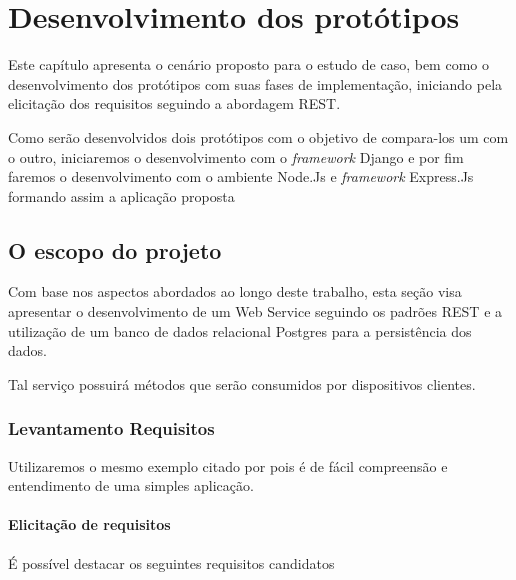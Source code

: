 
\chapter{Desenvolvimento dos protótipos}
\label{desenvolvimento-prototipos}

\vspace{-1.9cm}


  Este capítulo apresenta o cenário proposto para o estudo de caso, bem
  como o desenvolvimento dos protótipos com suas fases de implementação, iniciando
  pela elicitação dos requisitos seguindo a abordagem \ac{REST}.
  
  Como serão desenvolvidos dois protótipos com o objetivo de compara-los um com o outro,
  iniciaremos o desenvolvimento com o \textit{framework} Django e por fim faremos o desenvolvimento
  com o ambiente Node.Js e \textit{framework} Express.Js formando assim a aplicação proposta
  
\section{O escopo do projeto}
\label{escopo-projeto}

  Com base nos aspectos abordados ao longo deste trabalho, 
  esta seção visa apresentar o desenvolvimento de um Web Service seguindo os padrões \ac{REST} e a utilização 
  de um banco de dados relacional Postgres para a persistência dos dados.
  
  Tal serviço possuirá métodos que serão consumidos por dispositivos clientes.

\subsection{Levantamento Requisitos}
\label{levantamento-requisitos}

  Utilizaremos o mesmo exemplo citado por \cite{Pereira:2013} pois é de fácil compreensão
  e entendimento de uma simples aplicação.

\subsubsection{Elicitação de requisitos}

  É possível destacar os seguintes requisitos candidatos

